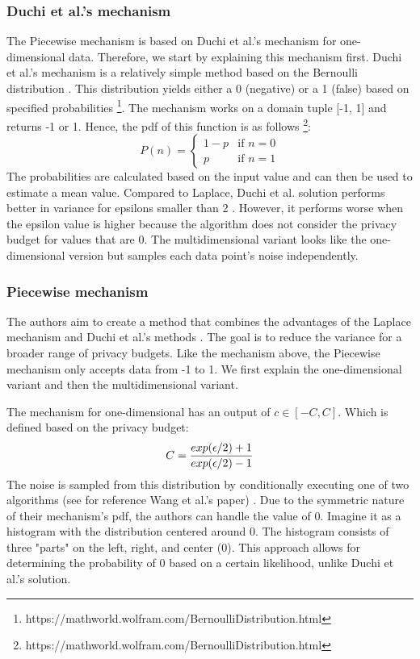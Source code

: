 \subsubsection{Duchi et al.'s mechanism}
The Piecewise mechanism is based on Duchi et al.'s mechanism for one-dimensional data.
Therefore, we start by explaining this mechanism first.
Duchi et al.'s mechanism is a relatively simple method based on the Bernoulli distribution \citep{duchi_minimax_2017}.
This distribution yields either a 0 (negative) or a 1 (false) based on specified probabilities \footnote{https://mathworld.wolfram.com/BernoulliDistribution.html}.
The mechanism works on a domain tuple [-1, 1] and returns -1 or 1.
Hence, the \gls{pdf} of this function is as follows \footnote{https://mathworld.wolfram.com/BernoulliDistribution.html}:
\begin{equation}
    P(n) =
    \begin{cases}
        1 - p & \text{if } n = 0 \\
        p     & \text{if } n = 1
    \end{cases}
\end{equation}
The probabilities are calculated based on the input value and can then be used to estimate a mean value.
Compared to Laplace, Duchi et al. solution performs better in variance for epsilons smaller than 2 \citep{wang_collecting_2019}.
However, it performs worse when the epsilon value is higher because the algorithm does not consider the privacy budget for values that are 0.
The multidimensional variant looks like the one-dimensional version but samples each data point's noise independently.

\subsubsection*{Piecewise mechanism} \label{theory:piecewise}
The authors aim to create a method that combines the advantages of the Laplace mechanism and Duchi et al.'s methods \citep{wang_collecting_2019}.
The goal is to reduce the variance for a broader range of privacy budgets.
Like the mechanism above, the Piecewise mechanism only accepts data from -1 to 1.
We first explain the one-dimensional variant and then the multidimensional variant.

The mechanism for one-dimensional has an output of $c \in [-C, C]$.
Which is defined based on the privacy budget:
\begin{equation}
    C = \frac{exp(\epsilon/2)+1}{exp(\epsilon/2) - 1} \\
    \label{fig:piecewise-C}
\end{equation}
The noise is sampled from this distribution by conditionally executing one of two algorithms (see for reference Wang et al.'s paper) \citep{wang_collecting_2019}.
Due to the symmetric nature of their mechanism's \gls{pdf}, the authors can handle the value of 0.
Imagine it as a histogram with the distribution centered around 0.
The histogram consists of three "parts" on the left, right, and center (0).
This approach allows for determining the probability of 0 based on a certain likelihood, unlike Duchi et al.'s solution.

